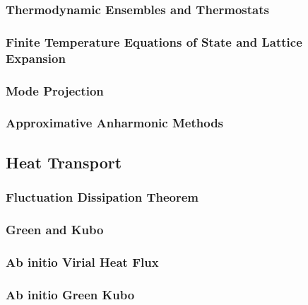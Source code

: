 \subsubsection{Thermodynamic Ensembles and Thermostats}
\subsubsection{Finite Temperature Equations of State and Lattice Expansion}
\subsubsection{Mode Projection}
\subsubsection{Approximative Anharmonic Methods}

\subsection{Heat Transport}
\subsubsection{Fluctuation Dissipation Theorem}
\subsubsection{Green and Kubo}
\subsubsection{Ab initio Virial Heat Flux}
\subsubsection{Ab initio Green Kubo}